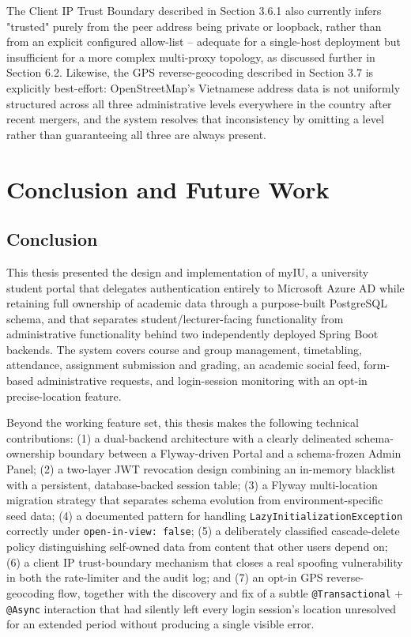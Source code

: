 \documentclass[12pt,a4paper]{report}
\begin{document}
The Client IP Trust Boundary described in Section 3.6.1 also currently
infers "trusted" purely from the peer address being private or
loopback, rather than from an explicit configured allow-list -- adequate
for a single-host deployment but insufficient for a more complex
multi-proxy topology, as discussed further in Section 6.2. Likewise,
the GPS reverse-geocoding described in Section 3.7 is explicitly
best-effort: OpenStreetMap's Vietnamese address data is not uniformly
structured across all three administrative levels everywhere in the
country after recent mergers, and the system resolves that
inconsistency by omitting a level rather than guaranteeing all three are
always present.

\chapter{Conclusion and Future Work}

\section{Conclusion}

This thesis presented the design and implementation of myIU, a
university student portal that delegates authentication entirely to
Microsoft Azure AD while retaining full ownership of academic data
through a purpose-built PostgreSQL schema, and that separates
student/lecturer-facing functionality from administrative functionality
behind two independently deployed Spring Boot backends. The system
covers course and group management, timetabling, attendance,
assignment submission and grading, an academic social feed,
form-based administrative requests, and login-session monitoring with
an opt-in precise-location feature.

Beyond the working feature set, this thesis makes the following
technical contributions: (1) a dual-backend architecture with a clearly
delineated schema-ownership boundary between a Flyway-driven Portal and
a schema-frozen Admin Panel; (2) a two-layer JWT revocation design
combining an in-memory blacklist with a persistent, database-backed
session table; (3) a Flyway multi-location migration strategy that
separates schema evolution from environment-specific seed data; (4) a
documented pattern for handling \texttt{LazyInitializationException}
correctly under \texttt{open-in-view: false}; (5) a deliberately
classified cascade-delete policy distinguishing self-owned data from
content that other users depend on; (6) a client IP trust-boundary
mechanism that closes a real spoofing vulnerability in both the
rate-limiter and the audit log; and (7) an opt-in GPS reverse-geocoding
flow, together with the discovery and fix of a subtle
\texttt{@Transactional} + \texttt{@Async} interaction that had silently
left every login session's location unresolved for an extended period
without producing a single visible error.
\end{document}
